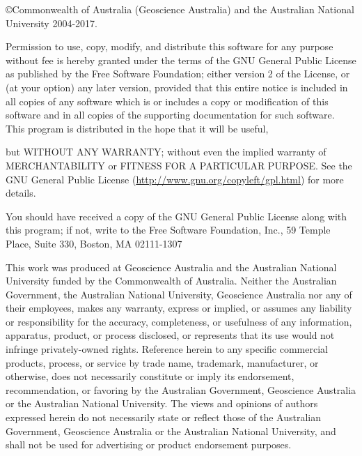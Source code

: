 %
%
%
%
%
%
%
%

\vspace*{0.5in}

\copyright Commonwealth of Australia (Geoscience Australia) and the Australian 
National University 2004-2017.

Permission to use, copy, modify, and distribute this software for any
purpose without fee is hereby granted under the terms of the GNU
General Public License as published by the Free Software Foundation;
either version 2 of the License, or (at your option) any later
version, provided that this entire notice is included in all copies
of any software which is or includes a copy or modification of this
software and in all copies of the supporting documentation for such
software.
This program is distributed in the hope that it will be useful,

but WITHOUT ANY WARRANTY; without even the implied warranty of
MERCHANTABILITY or FITNESS FOR A PARTICULAR PURPOSE.  See the
GNU General Public License (\url{http://www.gnu.org/copyleft/gpl.html})
for more details.

You should have received a copy of the GNU General Public License
along with this program; if not, write to the Free Software
Foundation, Inc., 59 Temple Place, Suite 330, Boston, MA  02111-1307

This work was produced at Geoscience Australia and the Australian
National University funded by the Commonwealth of Australia. Neither
the Australian Government, the Australian National University,
Geoscience Australia nor any of their employees, makes any warranty,
express or implied, or assumes any liability or responsibility for
the accuracy, completeness, or usefulness of any information,
apparatus, product, or process disclosed, or represents that its use
would not infringe privately-owned rights. Reference herein to any
specific commercial products, process, or service by trade name,
trademark, manufacturer, or otherwise, does not necessarily
constitute or imply its endorsement, recommendation, or favoring by
the Australian Government, Geoscience Australia or the Australian
National University.  The views and opinions of authors expressed
herein do not necessarily state or reflect those of the Australian
Government, Geoscience Australia or the Australian National
University, and shall not be used for advertising or product
endorsement purposes.


